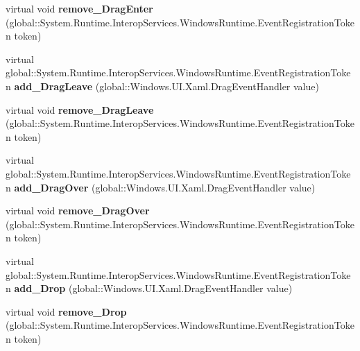 \begin{DoxyCompactItemize}
virtual void {\bfseries remove\+\_\+\+Drag\+Enter} (global\+::\+System.\+Runtime.\+Interop\+Services.\+Windows\+Runtime.\+Event\+Registration\+Token token)
\item 
\mbox{\label{class_windows_1_1_u_i_1_1_xaml_1_1_u_i_element_a09d1a9af723d25f04884ff5c295f0e44}} 
virtual global\+::\+System.\+Runtime.\+Interop\+Services.\+Windows\+Runtime.\+Event\+Registration\+Token {\bfseries add\+\_\+\+Drag\+Leave} (global\+::\+Windows.\+U\+I.\+Xaml.\+Drag\+Event\+Handler value)
\item 
\mbox{\label{class_windows_1_1_u_i_1_1_xaml_1_1_u_i_element_ad92e1bfdb1f8c87efd732bbc3fb71ab9}} 
virtual void {\bfseries remove\+\_\+\+Drag\+Leave} (global\+::\+System.\+Runtime.\+Interop\+Services.\+Windows\+Runtime.\+Event\+Registration\+Token token)
\item 
\mbox{\label{class_windows_1_1_u_i_1_1_xaml_1_1_u_i_element_ab912e89cec08f1d3a71ac840cb1a7964}} 
virtual global\+::\+System.\+Runtime.\+Interop\+Services.\+Windows\+Runtime.\+Event\+Registration\+Token {\bfseries add\+\_\+\+Drag\+Over} (global\+::\+Windows.\+U\+I.\+Xaml.\+Drag\+Event\+Handler value)
\item 
\mbox{\label{class_windows_1_1_u_i_1_1_xaml_1_1_u_i_element_a42cb32bddd90c0040c369b5317c8c3c4}} 
virtual void {\bfseries remove\+\_\+\+Drag\+Over} (global\+::\+System.\+Runtime.\+Interop\+Services.\+Windows\+Runtime.\+Event\+Registration\+Token token)
\item 
\mbox{\label{class_windows_1_1_u_i_1_1_xaml_1_1_u_i_element_aaa06508f3ebb80d04bb09db0a46cd1bf}} 
virtual global\+::\+System.\+Runtime.\+Interop\+Services.\+Windows\+Runtime.\+Event\+Registration\+Token {\bfseries add\+\_\+\+Drop} (global\+::\+Windows.\+U\+I.\+Xaml.\+Drag\+Event\+Handler value)
\item 
\mbox{\label{class_windows_1_1_u_i_1_1_xaml_1_1_u_i_element_ac2b3602dc7f654559858450b171f9b01}} 
virtual void {\bfseries remove\+\_\+\+Drop} (global\+::\+System.\+Runtime.\+Interop\+Services.\+Windows\+Runtime.\+Event\+Registration\+Token token)

\end{DoxyCompactItemize}
